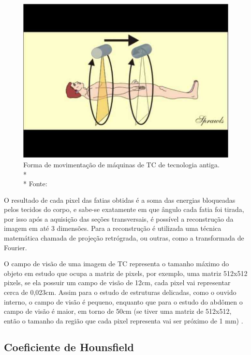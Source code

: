 \begin{figure}[ht]
 \begin{center}
  \includegraphics{imagens/tc2.jpg}
 \end{center}
 \caption[Forma de movimentação de máquinas de TC de tecnologia antiga.]{Forma de movimentação de máquinas de TC de tecnologia antiga.\\* \\* Fonte: \citealt{sprawls}}
 \label{fig:tc2}
\end{figure}

O resultado de cada pixel das fatias obtidas é a soma das energias bloqueadas pelos tecidos do corpo, e sabe-se exatamente em que ângulo cada fatia foi tirada, por isso após a aquisição das seções transversais, é possível a reconstrução da imagem em até 3 dimensões. Para a reconstrução é utilizada uma técnica matemática chamada de projeção retrógrada, ou outras, como a transformada de Fourier.

O campo de visão de uma imagem de TC representa o tamanho máximo do objeto em estudo que ocupa a matriz de pixels, por exemplo, uma matriz 512x512 pixels, se ela possuir um campo de visão de 12cm, cada pixel vai representar cerca de 0,023cm. Assim para o estudo de estruturas delicadas, como o ouvido interno, o campo de visão é pequeno, enquanto que para o estudo do abdômen o campo de visão é maior, em torno de 50cm (se tiver uma matriz de 512x512, então o tamanho da região que cada pixel representa vai ser próximo de 1 mm) \cite{tomo}.

\subsection{Coeficiente de Hounsfield}

